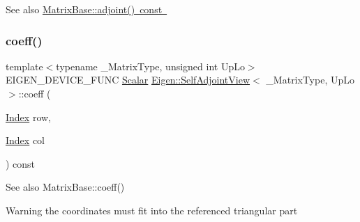 \begin{DoxySeeAlso}{See also}
\mbox{\hyperlink{class_eigen_1_1_matrix_base_afacca1f88da57e5cd87dd07c8ff926bb}{Matrix\+Base\+::adjoint() const }} 
\end{DoxySeeAlso}
\mbox{\label{class_eigen_1_1_self_adjoint_view_ad49cb2f908a2069cbacf9836b9bd6b84}} 
\subsubsection{\texorpdfstring{coeff()}{coeff()}}
{\footnotesize\ttfamily template$<$typename \+\_\+\+Matrix\+Type, unsigned int Up\+Lo$>$ \\
E\+I\+G\+E\+N\+\_\+\+D\+E\+V\+I\+C\+E\+\_\+\+F\+U\+NC \mbox{\hyperlink{class_eigen_1_1_self_adjoint_view_af52acc0942ece2de9b6db4a99cc6656e}{Scalar}} \mbox{\hyperlink{class_eigen_1_1_self_adjoint_view}{Eigen\+::\+Self\+Adjoint\+View}}$<$ \+\_\+\+Matrix\+Type, Up\+Lo $>$\+::coeff (\begin{DoxyParamCaption}\item[{\mbox{\hyperlink{struct_eigen_1_1_eigen_base_a554f30542cc2316add4b1ea0a492ff02}{Index}}}]{row,  }\item[{\mbox{\hyperlink{struct_eigen_1_1_eigen_base_a554f30542cc2316add4b1ea0a492ff02}{Index}}}]{col }\end{DoxyParamCaption}) const\hspace{0.3cm}{\ttfamily [inline]}}

\begin{DoxySeeAlso}{See also}
Matrix\+Base\+::coeff() 
\end{DoxySeeAlso}
\begin{DoxyWarning}{Warning}
the coordinates must fit into the referenced triangular part 
\end{DoxyWarning}
\mbox{\label{class_eigen_1_1_self_adjoint_view_a1f0c389753a56b97bbb26dcab820f111}} 
